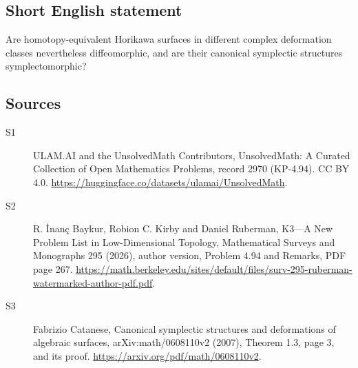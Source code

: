 \documentclass[11pt]{article}
\begin{document}
\subsection{Short English statement}
Are homotopy-equivalent Horikawa surfaces in different complex deformation classes nevertheless diffeomorphic, and are their canonical symplectic structures symplectomorphic?
\subsection{Sources}
\begin{description}
\item[\hypertarget{source:2970:1}{S1}] ULAM.AI and the UnsolvedMath Contributors, UnsolvedMath: A Curated Collection of Open Mathematics Problems, record 2970 (KP-4.94). CC BY 4.0. \url{https://huggingface.co/datasets/ulamai/UnsolvedMath}.
\item[\hypertarget{source:2970:2}{S2}] R. İnanç Baykur, Robion C. Kirby and Daniel Ruberman, K3—A New Problem List in Low-Dimensional Topology, Mathematical Surveys and Monographs 295 (2026), author version, Problem 4.94 and Remarks, PDF page 267. \url{https://math.berkeley.edu/sites/default/files/surv-295-ruberman-watermarked-author-pdf.pdf}.
\item[\hypertarget{source:2970:3}{S3}] Fabrizio Catanese, Canonical symplectic structures and deformations of algebraic surfaces, arXiv:math/0608110v2 (2007), Theorem 1.3, page 3, and its proof. \url{https://arxiv.org/pdf/math/0608110v2}.
\end{description}
\label{end:2970}
\end{document}
